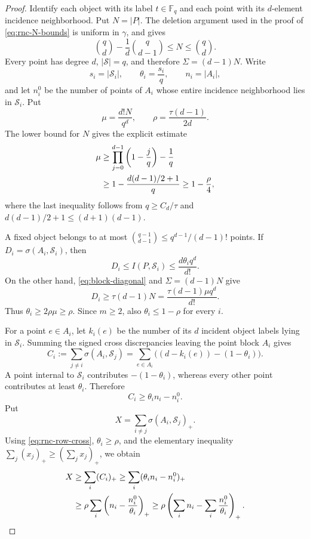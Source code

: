 \documentclass[11pt,letterpaper]{amsart}
\theoremstyle{definition}
\theoremstyle{remark}
\newcommand{\1}{\mathbf 1}
\begin{document}
\begin{proof}
Identify each object with its label $t\in\mathbb F_q$ and each point with its $d$-element incidence neighborhood.  Put $N=|P|$.  The deletion argument used in the proof of \eqref{eq:rnc-N-bounds} is uniform in $\gamma$, and gives
\[
 \binom qd-\frac1d\binom q{d-1}\le N\le\binom qd.
\]
Every point has degree $d$, $|\mathcal S|=q$, and therefore $\Sigma=(d-1)N$.  Write
\[
 s_i=|\mathcal S_i|,
 \qquad
 \theta_i=\frac{s_i}{q},
 \qquad
 n_i=|A_i|,
\]
and let $n_i^0$ be the number of points of $A_i$ whose entire incidence neighborhood lies in $\mathcal S_i$.  Put
\[
 \mu=\frac{d!N}{q^d},
 \qquad
 \rho=\frac{\tau(d-1)}{2d}.
\]
The lower bound for $N$ gives the explicit estimate
\begin{align}
 \mu
 &\ge \prod_{j=0}^{d-1}\left(1-\frac jq\right)-\frac1q\notag\\
 &\ge1-\frac{d(d-1)/2+1}{q}
 \ge1-\frac\rho4,
 \label{eq:rnc-mu}
\end{align}
where the last inequality follows from $q\ge C_d/\tau$ and $d(d-1)/2+1\le(d+1)(d-1)$.

A fixed object belongs to at most $\binom{q-1}{d-1}\le q^{d-1}/(d-1)!$ points.  If $D_i=\sigma(A_i,\mathcal S_i)$, then
\[
 D_i\le I(P,\mathcal S_i)
 \le\frac{d\theta_iq^d}{d!}.
\]
On the other hand, \eqref{eq:block-diagonal} and $\Sigma=(d-1)N$ give
\[
 D_i\ge\tau(d-1)N
 =\frac{\tau(d-1)\mu q^d}{d!}.
\]
Thus $\theta_i\ge2\rho\mu\ge\rho$.  Since $m\ge2$, also $\theta_i\le1-\rho$ for every $i$.

For a point $e\in A_i$, let $k_i(e)$ be the number of its $d$ incident object labels lying in $\mathcal S_i$.  Summing the signed cross discrepancies leaving the point block $A_i$ gives
\[
 C_i:=\sum_{j\ne i}\sigma(A_i,\mathcal S_j)
 =\sum_{e\in A_i}\bigl((d-k_i(e))-(1-\theta_i)\bigr).
\]
A point internal to $\mathcal S_i$ contributes $-(1-\theta_i)$, whereas every other point contributes at least $\theta_i$.  Therefore
\begin{equation}\label{eq:rnc-row-cross}
 C_i\ge\theta_i n_i-n_i^0.
\end{equation}
Put
\[
 X=\sum_{i\ne j}\sigma(A_i,\mathcal S_j)_+.
\]
Using \eqref{eq:rnc-row-cross}, $\theta_i\ge\rho$, and the elementary inequality $\sum_j(x_j)_+\ge(\sum_jx_j)_+$, we obtain
\begin{align}
 X
 &\ge\sum_i(C_i)_+
 \ge\sum_i(\theta_i n_i-n_i^0)_+\notag\\
 &\ge\rho\sum_i\left(n_i-\frac{n_i^0}{\theta_i}\right)_+
 \ge\rho\left(\sum_i n_i-\sum_i\frac{n_i^0}{\theta_i}\right)_+.
 \label{eq:rnc-X}
\end{align}


\end{proof}
\end{document}
